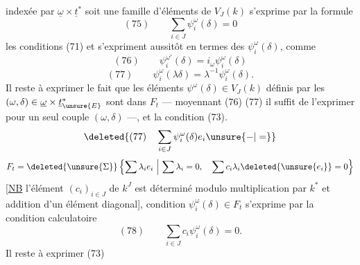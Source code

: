indexée par $\underline\omega\times\underline t^*$ soit une famille d'éléments
de $V_J(k)$ s'exprime par la formule
\[
(75)\qquad\sum_{i\in J}\psi_i^\omega(\delta)=0
\]
les  conditions (71) et  s'expriment
aussitôt en termes des $\psi_i^\omega(\delta)$, comme
\[
(76)\qquad\psi_i^{\omega'}(\delta)=i_\omega\psi_i^\omega(\delta)
\]
\[
(77)\qquad\psi_i^\omega(\lambda\delta)=\lambda^{-1}\psi_i^\omega(\delta).
\]
Il reste à exprimer le fait que les éléments
$\psi^\omega(\delta)\in V_J(k)$ définis par les $(\omega,\delta)\in\underline\omega\times\underline t_{\unsure{E}}^*$ sont
dans $F_t$ --- moyennant (76) (77) il suffit de
l'exprimer pour un seul couple $(\omega,\delta)$ ---,
et la condition (73).
\[
\deleted{(77)\quad\sum_{i\in J}\psi_i^\omega(\delta)e_i\unsure{-|=}}
\]
\[
F_t=\deleted{\unsure{\Sigma}}\left\{\sum\lambda_i e_i\ \middle|\ \sum\lambda_i=0,\quad
\sum c_i\lambda_i\deleted{\unsure{e_i}}=0\right\}
\]
[\uline{NB} l'élément $(c_i)_{i\in J}$ de \deleted{$\unsure{\Sigma}$}$k^J$ est déterminé
modulo multiplication par $k^*$ et addition d'un élément
diagonal],  condition $\psi_i^\omega(\delta)\in F_t$
s'exprime par la condition calculatoire
\[
(78)\qquad\sum_{i\in J}c_i\psi_i^\omega(\delta)=0.
\]
Il reste  à exprimer (73)
